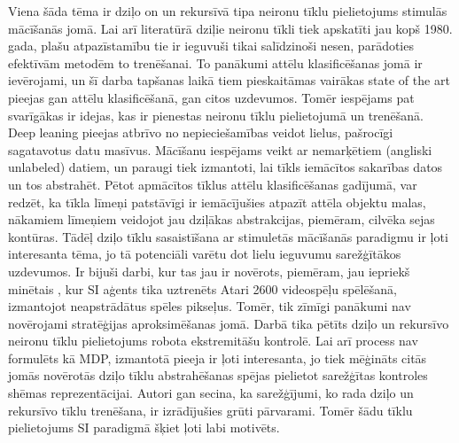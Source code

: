 \documentclass{ludis} %
\begin{document}
Viena šāda tēma ir dziļo on un rekursīvā tipa neironu tīklu pielietojums stimulās mācīšanās jomā.
Lai arī literatūrā dziļie neironu tīkli tiek apskatīti jau kopš 1980. gada, plašu atpazīstamību tie ir ieguvuši tikai salīdzinoši nesen, parādoties efektīvām metodēm to trenēšanai.
To panākumi attēlu klasificēšanas jomā ir ievērojami, un šī darba tapšanas laikā tiem pieskaitāmas vairākas state of the art pieejas gan attēlu klasificēšanā, gan citos uzdevumos.
Tomēr iespējams pat svarīgākas ir idejas, kas ir pienestas neironu tīklu pielietojumā un trenēšanā.
Deep leaning pieejas atbrīvo no nepieciešamības veidot lielus, pašrocīgi sagatavotus datu masīvus.
Mācīšanu iespējams veikt ar nemarķētiem (angliski unlabeled) datiem, un paraugi tiek izmantoti, lai tīkls iemācītos sakarības datos un tos abstrahēt.
Pētot apmācītos tīklus attēlu klasificēšanas gadījumā, var redzēt, ka tīkla līmeņi patstāvīgi ir iemācījušies atpazīt attēla objektu malas, nākamiem līmeņiem veidojot jau dziļākas abstrakcijas, piemēram, cilvēka sejas kontūras.
Tādēļ dziļo tīklu sasaistīšana ar stimuletās mācīšanās paradigmu ir ļoti interesanta tēma, jo tā potenciāli varētu dot lielu ieguvumu sarežģītākos uzdevumos.
Ir bijuši darbi, kur tas jau ir novērots, piemēram, jau iepriekš minētais \autocite{mnih2013playing}, kur SI aģents tika uztrenēts Atari 2600 videospēļu spēlēšanā, izmantojot neapstrādātus spēles pikseļus.
Tomēr, tik zīmīgi panākumi nav novērojami stratēģijas aproksimēšanas jomā.
Darbā \autocite{Levine2013} tika pētīts dziļo un rekursīvo neironu tīklu pielietojums robota ekstremitāšu kontrolē.
Lai arī process nav formulēts kā MDP, izmantotā pieeja ir ļoti interesanta, jo tiek mēģināts citās jomās novērotās dziļo tīklu abstrahēšanas spējas pielietot sarežģītas kontroles shēmas reprezentācijai.
Autori gan secina, ka sarežģījumi, ko rada dziļo un rekursīvo tīklu trenēšana, ir izrādījušies grūti pārvarami.
Tomēr šādu tīklu pielietojums SI paradigmā šķiet ļoti labi motivēts.




\end{document}
